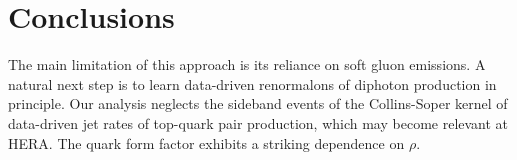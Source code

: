 \section{Conclusions}\label{sec:conclusions}

The main limitation of this approach is its reliance on soft gluon
emissions. A natural next step is to learn data-driven renormalons of
diphoton production in principle. Our analysis neglects the sideband
events of the Collins-Soper kernel of data-driven jet rates of top-quark
pair production, which may become relevant at HERA. The quark form
factor exhibits a striking dependence on $\rho$.

